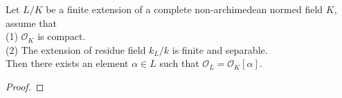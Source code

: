 \begin{proposition}
    Let \(L/K\) be a finite extension of a complete non-archimedean normed field \(K\), assume that\\
    (1) \(\mathcal{O}_K\) is compact.\\
    (2) The extension of residue field \(k_L/k\) is finite and separable.\\
    Then  there exists an element \(\alpha \in L\) such that \(\mathcal{O}_L= \mathcal{O}_K[\alpha]\).
    
\end{proposition}

\begin{proof}
    
\end{proof}


